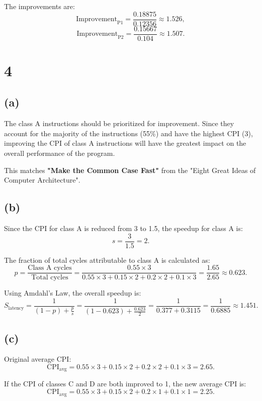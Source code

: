 \documentclass[12pt]{article}
\begin{document}
The improvements are:
$$
\text{Improvement}_{\text{P1}} = \frac{0.18875}{0.12356} \approx 1.526,
$$
$$
\text{Improvement}_{\text{P2}} = \frac{0.15667}{0.104} \approx 1.507.
$$


\section*{4}

\subsection*{(a)}
The class A instructions should be prioritized for improvement. Since they account for the majority of the instructions (55\%) and have the highest CPI (3), improving the CPI of class A instructions will have the greatest impact on the overall performance of the program.

This matches \textbf{"Make the Common Case Fast"} from the "Eight Great Ideas of Computer Architecture".

\subsection*{(b)}
Since the CPI for class A is reduced from 3 to 1.5, the speedup for class A is:
$$
s = \frac{3}{1.5} = 2.
$$

The fraction of total cycles attributable to class A is calculated as:
$$
p = \frac{\text{Class A cycles}}{\text{Total cycles}} 
    = \frac{0.55 \times 3}{0.55 \times 3 + 0.15 \times 2 + 0.2 \times 2 + 0.1 \times 3} 
    = \frac{1.65}{2.65} \approx 0.623.
$$

Using Amdahl's Law, the overall speedup is:
$$
S_{\text{latency}} = \frac{1}{(1 - p) + \frac{p}{s}} 
                                     = \frac{1}{(1 - 0.623) + \frac{0.623}{2}}
                                     = \frac{1}{0.377 + 0.3115}
                                     = \frac{1}{0.6885}
                                     \approx 1.451.
$$

\subsection*{(c)}
Original average CPI:
$$
\text{CPI}_{\text{avg}} = 0.55 \times 3 + 0.15 \times 2 + 0.2 \times 2 + 0.1 \times 3 = 2.65.
$$

If the CPI of classes C and D are both improved to 1, the new average CPI is:
$$
\text{CPI}_{\text{avg}} = 0.55 \times 3 + 0.15 \times 2 + 0.2 \times 1 + 0.1 \times 1 = 2.25.
$$
\end{document}

